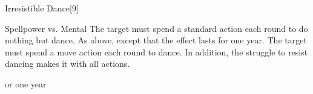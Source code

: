 \begin{spellsection}{Irresistible Dance}[9]
    \begin{spellheader}
    \end{spellheader}
    \begin{spellcontent}
        \begin{spelltargetinginfo}
        \end{spelltargetinginfo}
        \begin{spelleffects}
            \begin{spellattack}{Spellpower vs. Mental}
                \spellsuccess The target must spend a standard action each round to do nothing but dance.
                \spellcritical As above, except that the effect lasts for one year.
                \spellfailure The target must spend a move action each round to dance.
                    In addition, the struggle to resist dancing makes it \impaired with all actions.
            \end{spellattack}
            \spelldur \durbrief or one year
        \end{spelleffects}
    \end{spellcontent}
    \begin{spellfooter}
        \miscastrandom
    \end{spellfooter}
\end{spellsection}


